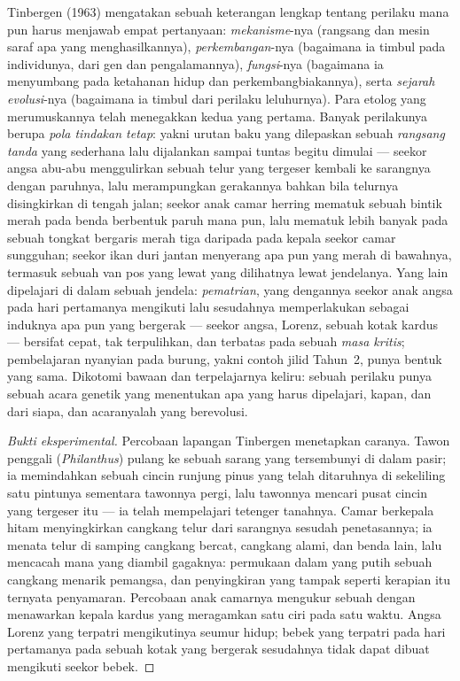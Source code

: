 \begin{definition}\label{def:b3:behavioural-ecology:tinbergen}
%
Tinbergen (1963) mengatakan sebuah keterangan lengkap tentang perilaku mana pun harus menjawab
empat pertanyaan: \emph{mekanisme}-nya (rangsang dan mesin saraf apa yang
menghasilkannya), \emph{perkembangan}-nya (bagaimana ia timbul pada individunya,
dari gen dan pengalamannya), \emph{fungsi}-nya (bagaimana ia menyumbang pada
ketahanan hidup dan perkembangbiakannya), serta \emph{sejarah evolusi}-nya (bagaimana ia
timbul dari perilaku leluhurnya). Para etolog yang merumuskannya telah
menegakkan kedua yang pertama. Banyak perilakunya berupa \emph{pola tindakan
tetap}: yakni urutan baku yang dilepaskan sebuah \emph{rangsang tanda} yang
sederhana lalu dijalankan sampai tuntas begitu dimulai --- seekor angsa abu-abu menggulirkan sebuah
telur yang tergeser kembali ke sarangnya dengan paruhnya, lalu merampungkan gerakannya
bahkan bila telurnya disingkirkan di tengah jalan; seekor anak camar herring mematuk sebuah bintik
merah pada benda berbentuk paruh mana pun, lalu mematuk lebih banyak pada sebuah tongkat bergaris merah
tiga daripada pada kepala seekor camar sungguhan; seekor ikan duri jantan menyerang apa pun yang
merah di bawahnya, termasuk sebuah van pos yang lewat yang dilihatnya lewat
jendelanya. Yang lain dipelajari di dalam sebuah jendela: \emph{pematrian}, yang dengannya
seekor anak angsa pada hari pertamanya mengikuti lalu sesudahnya memperlakukan sebagai induknya
apa pun yang bergerak --- seekor angsa, Lorenz, sebuah kotak kardus --- bersifat cepat,
tak terpulihkan, dan terbatas pada sebuah \emph{masa kritis}; pembelajaran nyanyian pada
burung, yakni contoh jilid Tahun~2, punya bentuk yang sama. Dikotomi
bawaan dan terpelajarnya keliru: sebuah perilaku punya sebuah acara genetik
yang menentukan apa yang harus dipelajari, kapan, dan dari siapa, dan
acaranyalah yang berevolusi.
\end{definition}

\begin{proof}[Bukti eksperimental]
Percobaan lapangan Tinbergen menetapkan caranya. Tawon penggali
(\emph{Philanthus}) pulang ke sebuah sarang yang tersembunyi di dalam pasir; ia memindahkan sebuah cincin
runjung pinus yang telah ditaruhnya di sekeliling satu pintunya sementara tawonnya pergi,
lalu tawonnya mencari pusat cincin yang tergeser itu --- ia telah mempelajari
tetenger tanahnya. Camar berkepala hitam menyingkirkan cangkang telur dari sarangnya sesudah
penetasannya; ia menata telur di samping cangkang bercat, cangkang alami, dan
benda lain, lalu mencacah mana yang diambil gagaknya: permukaan dalam
yang putih sebuah cangkang menarik pemangsa, dan penyingkiran yang tampak
seperti kerapian itu ternyata penyamaran. Percobaan anak camarnya mengukur sebuah
 dengan menawarkan kepala kardus yang meragamkan satu ciri pada satu
waktu. Angsa Lorenz yang terpatri mengikutinya seumur hidup; bebek yang terpatri
pada hari pertamanya pada sebuah kotak yang bergerak sesudahnya tidak dapat dibuat
mengikuti seekor bebek.
\end{proof}

